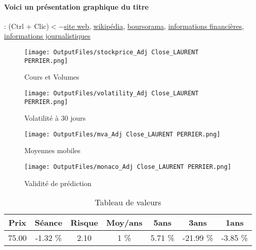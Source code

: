 \documentclass[11pt,a4paper]{report}%
\begin{document}
\paragraph{Voici un présentation graphique du titre} : (Ctrl + Clic)$<-$\href{https://www.laurent-perrier.com/}{site web}, \href{https://fr.wikipedia.org/wiki/Laurent-Perrier}{wikipédia}, \href{https://www.boursorama.com/cours/1rPLPE}{boursorama}, \href{https://www.qwant.com/?q=site:https:%2f%2fwww.easybourse.com%2faction-societe%2fLAURENT-PERRIER&t=web&client=ext-firefox-hp}{informations financières}, \href{https://bourse.lerevenu.com/cours-de-bourse/fiche-valeur-synthese/LAURENT-PERRIER/LPE-FR}{informations journalistiques}
\begin{figure}[!htb]
   \begin{minipage}{0.5\textwidth}
     \centering
     \texttt{[image: OutputFiles/stockprice\_Adj Close\_LAURENT PERRIER.png]}
     \caption{Cours et Volumes}\label{Fig:price_LAURENT PERRIER}
   \end{minipage}\hfill
   \begin{minipage}{0.5\textwidth}
     \centering
     \texttt{[image: OutputFiles/volatility\_Adj Close\_LAURENT PERRIER.png]}
     \caption{Volatilité à 30 jours}\label{Fig:volat_LAURENT PERRIER}
   \end{minipage}
\end{figure}
\begin{figure}[!htb]
   \begin{minipage}{0.5\textwidth}
     \centering
     \texttt{[image: OutputFiles/mva\_Adj Close\_LAURENT PERRIER.png]}
     \caption{Moyennes mobiles}\label{Fig:mva_LAURENT PERRIER}
   \end{minipage}\hfill
   \begin{minipage}{0.5\textwidth}
     \centering
     \texttt{[image: OutputFiles/monaco\_Adj Close\_LAURENT PERRIER.png]}
     \caption{Validité de prédiction}\label{Fig:prediction_LAURENT PERRIER}
   \end{minipage}
\end{figure}

\begin{table}[H]
  \centering
    \begin{tabular}{|c|c|c|c|c|c|c|}
    \hline
    Prix & Séance & Risque  & Moy/ans & 5ans & 3ans & 1ans \\
    \hline
    75.00 &    -1.32 \%    & 2.10 & 1 \% & 5.71 \% & -21.99 \% & -3.85 \% \\
    \hline
    \end{tabular}%
        \label{tab:table_LAURENT PERRIER}%
      \caption{Tableau de valeurs}
\end{table}%
\end{document}

